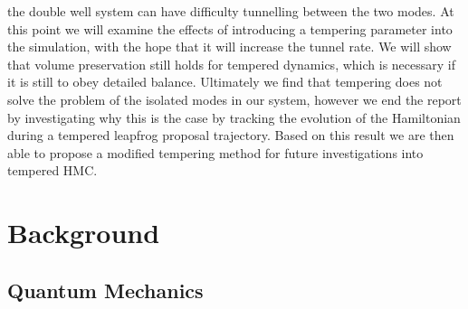 \documentclass[12pt]{article}
\begin{document}
the double well system can have difficulty tunnelling between the two modes. At this point we will examine the effects of introducing a tempering parameter into the simulation, with the hope that it will increase the tunnel rate. We will show that volume preservation still holds for tempered dynamics, which is necessary if it is still to obey detailed balance. Ultimately we find that tempering does not solve the problem of the isolated modes in our system, however we end the report by investigating why this is the case by tracking the evolution of the Hamiltonian during a tempered leapfrog proposal trajectory. Based on this result we are then able to propose a modified tempering method for future investigations into tempered HMC.


\section{Background}
    \subsection{Quantum Mechanics}
\end{document}
